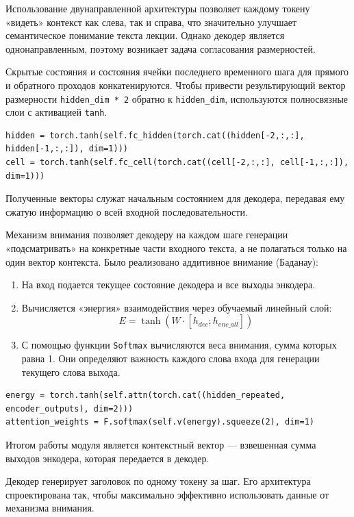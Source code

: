 \documentclass[coursework]{SCWorks}
\begin{document}
    Использование двунаправленной архитектуры позволяет каждому токену «видеть» контекст как слева, так и справа,
    что значительно улучшает семантическое понимание текста лекции.
    Однако декодер является однонаправленным, поэтому возникает задача согласования размерностей.

    Скрытые состояния и состояния ячейки последнего временного шага для прямого и обратного проходов конкатенируются.
    Чтобы привести результирующий вектор размерности \texttt{hidden\_dim * 2} обратно к \texttt{hidden\_dim},
    используются полносвязные слои с активацией \texttt{tanh}.

    \begin{verbatim}
hidden = torch.tanh(self.fc_hidden(torch.cat((hidden[-2,:,:], hidden[-1,:,:]), dim=1)))
cell = torch.tanh(self.fc_cell(torch.cat((cell[-2,:,:], cell[-1,:,:]), dim=1)))
    \end{verbatim}

    Полученные векторы служат начальным состоянием для декодера, передавая ему сжатую информацию о всей входной последовательности.

    Механизм внимания позволяет декодеру на каждом шаге генерации «подсматривать» на конкретные части входного текста,
    а не полагаться только на один вектор контекста.
    Было реализовано аддитивное внимание (Баданау):

    \begin{enumerate}
        \item На вход подается текущее состояние декодера и все выходы энкодера.
        \item Вычисляется «энергия» взаимодействия через обучаемый линейный слой: \[E = \tanh(W \cdot [h_{dec}; h_{enc\_all}])\]
        \item С помощью функции \texttt{Softmax} вычисляются веса внимания, сумма которых равна 1.
        Они определяют важность каждого слова входа для генерации текущего слова выхода.
    \end{enumerate}

    \begin{verbatim}
energy = torch.tanh(self.attn(torch.cat((hidden_repeated, encoder_outputs), dim=2)))
attention_weights = F.softmax(self.v(energy).squeeze(2), dim=1)
    \end{verbatim}

    Итогом работы модуля является контекстный вектор — взвешенная сумма выходов энкодера, которая передается в декодер.

    Декодер генерирует заголовок по одному токену за шаг.
    Его архитектура спроектирована так, чтобы максимально эффективно использовать данные от механизма внимания.
\end{document}
